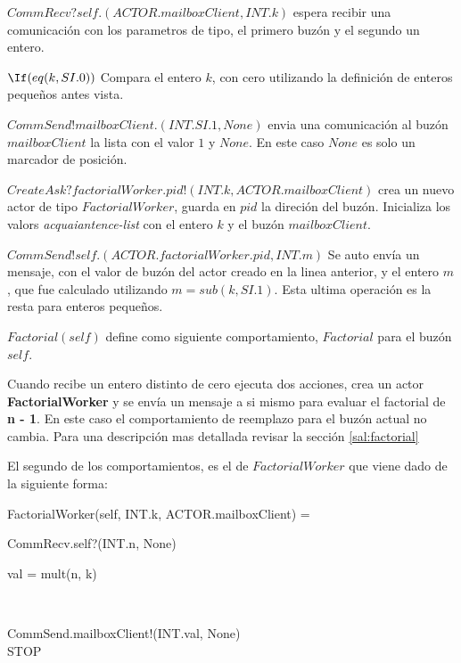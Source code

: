 \begin{description}
 \item $CommRecv?self.(ACTOR.mailboxClient, INT.k)$ espera recibir una comunicación con los parametros de tipo, el primero buzón y el segundo un entero.
 \item $\If (eq(k,SI.0))$ Compara el entero $k$, con cero utilizando la definición de enteros pequeños antes vista.
 \item $CommSend!mailboxClient.(INT.SI.1, None)$ envia una comunicación al buzón $mailboxClient$ la lista con el valor $1$ y $None$. En este caso $None$ es solo un marcador de posición.
 \item $CreateAsk?factorialWorker.pid!(INT.k, ACTOR.mailboxClient)$ crea un nuevo actor de tipo $FactorialWorker$, guarda en $pid$ la direción del buzón. Inicializa los valors \textit{acquaiantence-list} con el entero $k$ y el buzón $mailboxClient$.
 \item $CommSend!self.(ACTOR.factorialWorker.pid, INT.m)$ Se auto envía un mensaje, con el valor de buzón del actor creado en la linea anterior, y el entero $m$, que fue calculado utilizando $m  = sub(k, SI.1)$. Esta ultima operación es la resta para enteros pequeños.
 \item $Factorial(self)$ define como siguiente comportamiento, $Factorial$ para el buzón $self$.
\end{description}

Cuando recibe un entero distinto de cero ejecuta dos acciones, crea un actor \textbf{FactorialWorker} y se envía un mensaje a si mismo para evaluar el factorial de \textbf{n - 1}. En este caso el comportamiento de reemplazo para el buzón actual no cambia. Para una descripción mas detallada revisar la sección \ref{sal:factorial}

El segundo de los comportamientos, es el de $FactorialWorker$ que viene dado de la siguiente forma:

\begin{process}
FactorialWorker(self, INT.k, ACTOR.mailboxClient) = {} \\ \quad
  \begin{block}
  CommRecv.self?(INT.n, None) \then {} \\ \quad
    \begin{block}
    \begin{declaration}
    val = mult(n, k) 
    \end{declaration} \\
    \begin{within}
    CommSend.mailboxClient!(INT.val, None) \then \\
    STOP
    \end{within}
    \end{block}
  \end{block}
\end{process}

